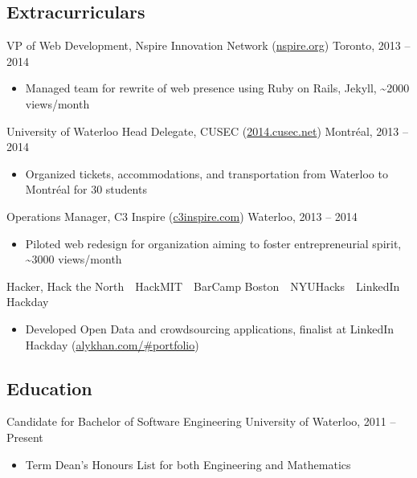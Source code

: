 \documentclass[11pt,letterpaper]{article}
\begin{document}
\subsection*{Extracurriculars}
\noindent
VP of Web Development, Nspire Innovation Network (\href{http://nspire.org}{nspire.org}) \hfill {\color{gray} Toronto, 2013 -- 2014}
\begin{itemize}
\item Managed team for rewrite of web presence using Ruby on Rails, Jekyll, \textasciitilde2000 views/month
\end{itemize}

\noindent
University of Waterloo Head Delegate, CUSEC (\href{http://2014.cusec.net}{2014.cusec.net}) \hfill {\color{gray} Montr\'{e}al, 2013 -- 2014}
\begin{itemize}
\item Organized tickets, accommodations, and transportation from Waterloo to Montr\'{e}al for 30 students
\end{itemize}

\noindent
Operations Manager, C3 Inspire (\href{http://c3inspire.com}{c3inspire.com}) \hfill {\color{gray} Waterloo, 2013 -- 2014}
\begin{itemize}
\item Piloted web redesign for organization aiming to foster entrepreneurial spirit, \textasciitilde3000 views/month
\end{itemize}

\noindent
Hacker, Hack the North\ \textperiodcentered\ HackMIT\ \textperiodcentered\ BarCamp Boston\ \textperiodcentered\ NYUHacks\ \textperiodcentered\ LinkedIn Hackday
\begin{itemize}
\item Developed Open Data and crowdsourcing applications, finalist at LinkedIn Hackday (\href{http://alykhan.com/\#portfolio}{alykhan.com/\#portfolio})
\end{itemize}

\subsection*{Education}
\noindent
Candidate for Bachelor of Software Engineering \hfill {\color{gray} University of Waterloo, 2011 -- Present}
\begin{itemize}
\item Term Dean's Honours List for both Engineering and Mathematics
\end{itemize}
\end{document}

